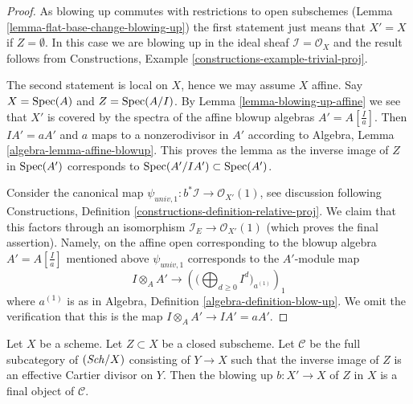 \begin{proof}
As blowing up commutes with restrictions to open subschemes
(Lemma \ref{lemma-flat-base-change-blowing-up}) the first statement
just means that $X' = X$ if $Z = \emptyset$. In this case we are blowing
up in the ideal sheaf $\mathcal{I} = \mathcal{O}_X$ and the result follows from
Constructions, Example \ref{constructions-example-trivial-proj}.

\medskip\noindent
The second statement is local on $X$, hence we may assume $X$ affine.
Say $X = \mathop{\mathrm{Spec}}(A)$ and $Z = \mathop{\mathrm{Spec}}(A/I)$. By Lemma \ref{lemma-blowing-up-affine}
we see that $X'$ is covered by the spectra of the affine blowup algebras
$A' = A[\frac{I}{a}]$. Then $IA' = aA'$ and $a$ maps to a nonzerodivisor
in $A'$ according to Algebra, Lemma \ref{algebra-lemma-affine-blowup}.
This proves the lemma as the inverse image of $Z$ in $\mathop{\mathrm{Spec}}(A')$
corresponds to $\mathop{\mathrm{Spec}}(A'/IA') \subset \mathop{\mathrm{Spec}}(A')$.

\medskip\noindent
Consider the canonical map
$\psi_{univ, 1} : b^*\mathcal{I} \to \mathcal{O}_{X'}(1)$, see
discussion following Constructions, Definition
\ref{constructions-definition-relative-proj}.
We claim that this factors through an isomorphism
$\mathcal{I}_E \to \mathcal{O}_{X'}(1)$ (which proves the final assertion).
Namely, on the affine open corresponding to the blowup algebra
$A' = A[\frac{I}{a}]$ mentioned above $\psi_{univ, 1}$ corresponds to
the $A'$-module map
$$
I \otimes_A A'
\longrightarrow
\left(\Big(\bigoplus\nolimits_{d \geq 0} I^d\Big)_{a^{(1)}}\right)_1
$$
where $a^{(1)}$ is as in Algebra, Definition \ref{algebra-definition-blow-up}.
We omit the verification that this is the map
$I \otimes_A A' \to IA' = aA'$.
\end{proof}

\begin{lemma}
\label{lemma-universal-property-blowing-up}
Let $X$ be a scheme. Let $Z \subset X$ be a closed subscheme.
Let $\mathcal{C}$ be the full subcategory of $(\mathit{Sch}/X)$ consisting
of $Y \to X$ such that the inverse image of $Z$ is an effective
Cartier divisor on $Y$. Then the blowing up $b : X' \to X$ of $Z$ in $X$
is a final object of $\mathcal{C}$.
\end{lemma}

